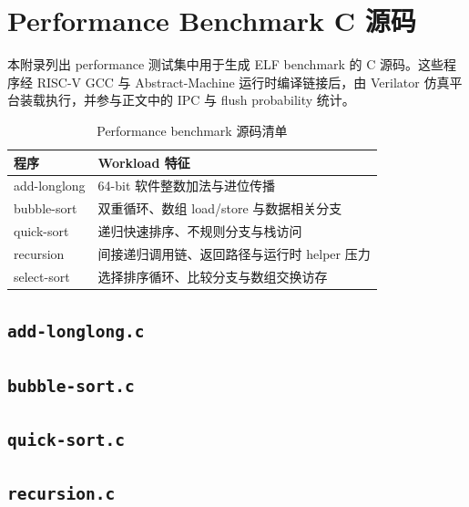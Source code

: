 \documentclass[UTF8,a4paper,12pt]{ctexrep}
\begin{document}
\chapter{Performance Benchmark C 源码}

本附录列出 performance 测试集中用于生成 ELF benchmark 的 C 源码。这些程序经 RISC-V GCC 与 Abstract-Machine 运行时编译链接后，由 Verilator 仿真平台装载执行，并参与正文中的 IPC 与 flush probability 统计。

\begin{table}[htbp]
  \centering
  \caption{Performance benchmark 源码清单}
  \begin{tabularx}{\textwidth}{lX}
    \toprule
    程序 & Workload 特征 \\
    \midrule
    add-longlong & 64-bit 软件整数加法与进位传播 \\
    bubble-sort & 双重循环、数组 load/store 与数据相关分支 \\
    quick-sort & 递归快速排序、不规则分支与栈访问 \\
    recursion & 间接递归调用链、返回路径与运行时 helper 压力 \\
    select-sort & 选择排序循环、比较分支与数组交换访存 \\
    \bottomrule
  \end{tabularx}
\end{table}

\section{\texttt{add-longlong.c}}



\section{\texttt{bubble-sort.c}}



\section{\texttt{quick-sort.c}}



\section{\texttt{recursion.c}}
\end{document}
